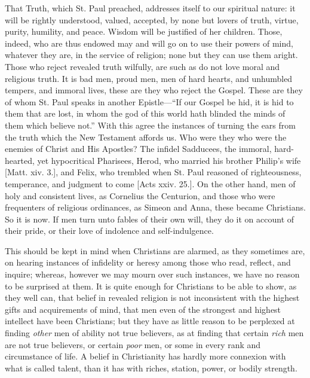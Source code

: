 That Truth, which St. Paul preached, addresses itself to our
spiritual nature: it will be rightly understood, valued, accepted, by
none but lovers of truth, virtue, purity, humility, and peace. Wisdom
will be justified of her children. Those, indeed, who are thus endowed
may and will go on to use their powers of mind, whatever they are, in
the service of religion; none but they can use them aright. Those who
reject revealed truth wilfully, are such as do not love moral and
religious truth. It is bad men, proud men, men of hard hearts, and
unhumbled tempers, and immoral lives, these are they who reject the
Gospel. These are they of whom St. Paul speaks in another Epistle—``If
our Gospel be hid, it is hid to them that are lost, in whom the god of
this world hath blinded the minds of them which believe not.''
With this agree the instances of turning the ears from the truth which
the New Testament affords us. Who were they who were the enemies of
Christ and His Apostles? The infidel Sadducees, the immoral,
hard-hearted, yet hypocritical Pharisees, Herod, who married his
brother Philip's wife [Matt. xiv. 3.], and Felix, who trembled when
St. Paul reasoned of righteousness, temperance, and judgment to come
[Acts xxiv. 25.]. On the other hand, men of holy and consistent lives,
as Cornelius the Centurion, and those who were frequenters of
religious ordinances, as Simeon and Anna, these became Christians. So
it is now. If men turn unto fables of their own will, they do it on
account of their pride, or their love of indolence and
self-indulgence.

This should be kept in mind when Christians are alarmed, as they
sometimes are, on hearing instances of infidelity or heresy among
those who read, reflect, and inquire; whereas, however we may mourn
over such instances, we have no reason to be surprised at them. It is
quite enough for Christians to be able to show, as they well can, that
belief in revealed religion is not inconsistent with the highest gifts
and acquirements of mind, that men even of the strongest and highest
intellect have been Christians; but they have as little reason to be
perplexed at finding \emph{other} men of ability not true believers,
as at finding that certain \emph{rich} men are not true believers, or
certain \emph{poor} men, or some in every rank and circumstance of
life. A belief in Christianity has hardly more connexion with what is
called talent, than it has with riches, station, power, or bodily
strength.

